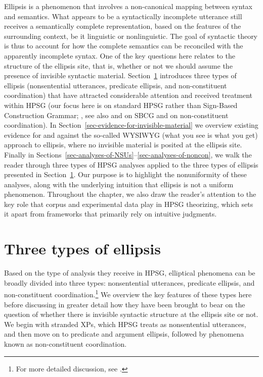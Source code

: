 Ellipsis is a phenomenon that involves a non-canonical mapping between syntax and semantics. What appears to be a syntactically incomplete utterance still receives a semantically complete representation, based on the features of the surrounding context, be it linguistic or nonlinguistic. The goal of syntactic theory is thus to account for how the complete semantics can be reconciled with the apparently incomplete syntax. One of the key questions here relates to the structure of the ellipsis site, that is, whether or not we should assume the presence of invisible syntactic material. Section~\ref{sec-three-types-of-ellipsis} introduces three types of ellipsis (nonsentential utterances, predicate ellipsis, and non-constituent coordination) that have attracted considerable attention and received treatment within HPSG (our focus here is on standard HPSG rather than Sign-Based Construction Grammar; \citealt{Sag2012}, see also  and  on SBCG and  on non-constituent coordination). 
In Section~\ref{sec-evidence-for-invisible-material} we overview existing evidence for and against the so-called WYSIWYG (what you see is what you get) approach to ellipsis, where no invisible material is posited at the ellipsis site. Finally in Sections~\ref{sec-analyses-of-NSUs}--\ref{sec-analyses-of-noncon}, we walk the reader through three types of HPSG analyses applied to the three types of ellipsis presented in Section~\ref{sec-three-types-of-ellipsis}. Our purpose is to highlight the nonuniformity of these analyses, along with the underlying intuition that ellipsis is not a uniform phenomenon. Throughout the chapter, we also draw the reader's attention to the key role that corpus and experimental data play in HPSG theorizing, which sets it apart from frameworks that primarily rely on intuitive judgments.



\section{Three types of ellipsis}
\label{sec-three-types-of-ellipsis}

Based on the type of analysis they receive in HPSG, elliptical phenomena can be broadly divided into three types:
         nonsentential utterances, predicate ellipsis, and non-constituent coordination.\footnote{For more detailed discussion, see \citet{Kim2020}.}
          We overview the key features of these types here before discussing in greater detail how they have been brought to bear on the question of whether there is invisible syntactic structure at the ellipsis site or not. We begin with stranded XPs, which HPSG treats as nonsentential utterances, and then move on to predicate and argument ellipsis, followed by phenomena known as non-constituent coordination.


